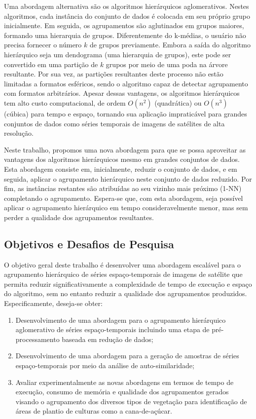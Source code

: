 Uma abordagem alternativa são os algoritmos hierárquicos aglomerativos. Nestes
algoritmos, cada instância do conjunto de dados é colocada em seu próprio grupo
inicialmente. Em seguida, os agrupamentos são aglutinados em grupos maiores, 
formando uma hierarquia de grupos. Diferentemente do k-médias, o usuário
não precisa fornecer o número $k$ de grupos previamente. Embora a saída do 
algoritmo hierárquico seja um dendograma (uma hierarquia de grupos), este pode
ser convertido em uma partição de $k$ grupos por meio de uma poda na árvore
resultante. Por sua vez, as partições resultantes deste processo não estão
limitadas a formatos esféricos, sendo o algoritmo capaz de detectar agrupamento
com formatos arbitrários. Apesar dessas vantagens, os algoritmos hierárquicos
tem alto custo computacional, de ordem $O(n^2)$ (quadrática) ou $O(n^3)$
(cúbica) para tempo e espaço, tornando sua aplicação impraticável para grandes
conjuntos de dados como séries temporais de imagens de satélites de alta
resolução.

Neste trabalho, propomos uma nova abordagem para que se possa aproveitar
as vantagens dos algoritmos hierárquicos mesmo em grandes conjuntos de dados.
Esta abordagem consiste em, inicialmente, reduzir o conjunto de dados, e em
seguida, aplicar o agrupamento hierárquico neste conjunto de dados reduzido. Por
fim, as instâncias restantes são atribuídas ao seu vizinho mais próximo (1-NN)
completando o agrupamento. Espera-se que, com esta abordagem, seja possível
aplicar o agrupamento hierárquico em tempo consideravelmente menor, mas sem
perder a qualidade dos agrupamentos resultantes.


\subsection{Objetivos e Desafios de Pesquisa}

O objetivo geral deste trabalho é desenvolver uma abordagem escalável para o agrupamento hierárquico de séries espaço-temporais de imagens de satélite que permita reduzir significativamente a complexidade de tempo de execução e espaço do algoritmo, sem no entanto reduzir a qualidade dos agrupamentos produzidos. Especificamente, deseja-se obter:

\begin{enumerate}
    \item Desenvolvimento de uma abordagem para o agrupamento hierárquico aglomerativo de séries espaço-temporais incluindo uma etapa de pré-processamento baseada em redução de dados;

    \item Desenvolvimento de uma abordagem para a geração de amostras de séries espaço-temporais por meio da análise de auto-similaridade;	
    
    \item Avaliar experimentalmente as novas abordagens em termos de tempo de execução, consumo de memória e qualidade dos agrupamentos gerados visando o agrupamento dos diversos tipos de vegetação para identificação de áreas de plantio de culturas como a cana-de-açúcar.
\end{enumerate}

